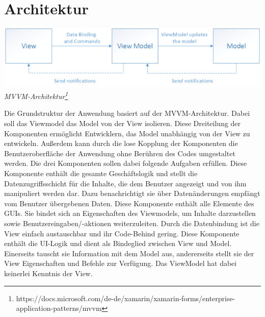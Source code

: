 \documentclass[../entwurf.tex]{subfiles}
\begin{document}
\section{Architektur}
\begin{center}
\includegraphics[scale=0.8]{../graphics/mvvm.png}
\textit{MVVM-Architektur\footnote{\tiny{https://docs.microsoft.com/de-de/xamarin/xamarin-forms/enterprise-application-patterns/mvvm}}}
\end{center}

Die Grundstruktur der Anwendung basiert auf der MVVM-Architektur. Dabei soll das Viewmodel das Model von der View isolieren. Diese Dreiteilung der Komponenten ermöglicht Entwicklern, das Model unabhängig von der View zu entwickeln. Außerdem kann durch die lose Kopplung der Komponenten die Benutzeroberfläche der Anwendung ohne Berühren des Codes umgestaltet werden. Die drei Komponenten sollen dabei folgende  Aufgaben erfüllen.
\newline
\newline
{}
\newline
Diese Komponente enthält die gesamte Geschäftslogik und stellt die Datenzugriffsschicht für die Inhalte, die dem Benutzer angezeigt und von ihm manipuliert werden dar. Dazu benachrichtigt sie über Datenänderungen empfängt vom Benutzer übergebenen Daten.
\newline
\newline
{}
\newline
Diese Komponente enthält alle Elemente des GUIs. Sie bindet sich an Eigenschaften des Viewmodels, um Inhalte darzustellen sowie Benutzereingaben/-aktionen weiterzuleiten. Durch die Datenbindung ist die View einfach austauschbar und ihr Code-Behind gering.
\newline
\newline
{}
\newline
Diese Komponente enthält die UI-Logik und dient als Bindeglied zwischen View und Model. Einerseits tauscht sie Information mit dem Model aus, andererseits stellt sie der View Eigenschaften und Befehle zur Verfügung.  Das ViewModel hat dabei keinerlei Kenntnis der View.


\end{document}
